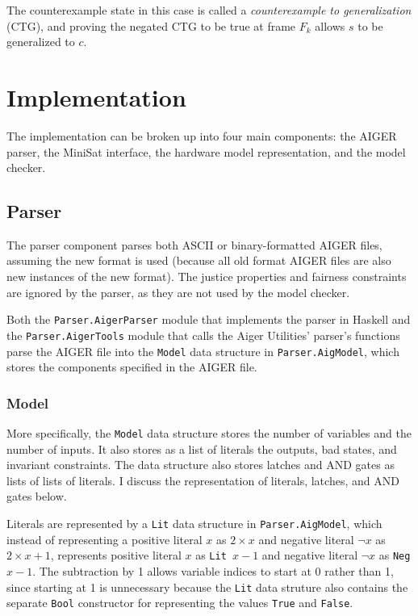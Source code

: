 \documentclass[12pt,a4paper,twoside,openright]{report}
\begin{document}
The counterexample state in this case is called a \emph{counterexample
to generalization} (CTG), and proving the negated CTG to be true at
frame $F_k$ allows $s$ to be generalized to $c$.


\chapter{Implementation}

The implementation can be broken up into four main components: the AIGER parser, the
MiniSat interface, the hardware model representation, and the model checker.


\section{Parser}

The parser component parses both ASCII or binary-formatted AIGER files,
assuming the new format is used (because all old format AIGER files are also
new instances of the new format). The justice properties and fairness constraints
are ignored by the parser, as they are not used by the model checker.

Both the \verb,Parser.AigerParser, module that implements the parser in Haskell and
the \verb,Parser.AigerTools, module that calls the Aiger Utilities' parser's functions
parse the AIGER file into the \verb,Model, data structure in \verb,Parser.AigModel,,
which stores the components specified in the AIGER file.

\subsection{Model}

More specifically, the \verb,Model, data structure stores the number of variables and
the number of inputs. It also stores as a list of literals the outputs, bad states,
and invariant constraints. The data structure also stores latches and AND gates as
lists of lists of literals. I discuss the representation of literals, latches, and
AND gates below.

Literals are represented by a \verb,Lit, data structure in \verb,Parser.AigModel,,
which instead of representing a positive literal $x$ as $2 \times x$ and negative
literal $\neg x$ as $2 \times x + 1$, represents positive literal $x$ as
\verb,Lit ,$x - 1$ and negative literal $\neg x$ as \verb,Neg ,$x - 1$. The subtraction
by 1 allows variable indices to start at 0 rather than 1, since starting at 1 is
unnecessary because the \verb,Lit, data struture also contains the separate
\verb,Bool, constructor for representing the values \verb,True, and \verb,False,.
\end{document}
